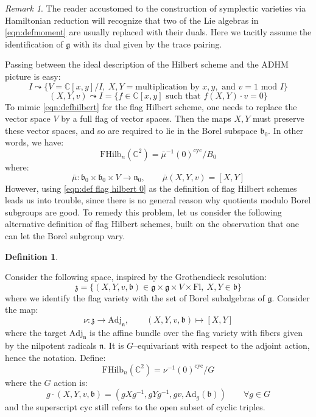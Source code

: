\documentclass[12pt]{amsart}
\numberwithin{equation}{section}
\theoremstyle{definition}
\newtheorem{definition}[theorem]{Definition}
\theoremstyle{remark}
\newtheorem{remark}[theorem]{Remark}
\newcommand{\CC}{\mathbb{C}}
\renewcommand{\1}{\mathbf{1}}
\newcommand{\cyc}{\text{cyc}}
\newcommand{\fl}{\text{Fl}}
\newcommand{\FH}{\mathrm{FHilb}}
\newcommand{\fg}{\mathfrak{g}}
\newcommand{\fb}{\mathfrak{b}}
\newcommand{\fn}{\mathfrak{n}}
\newcommand{\fz}{\mathfrak{z}}
\newcommand{\Adj}{\mathrm{Adj}}
\begin{document}
\begin{remark}

The reader accustomed to the construction of symplectic varieties via Hamiltonian reduction will recognize that two of the Lie algebras in \eqref{eqn:defmoment} are usually replaced with their duals. Here we tacitly assume the identification of $\fg$ with its dual given by the trace pairing.

\end{remark}

Passing between the ideal description of the Hilbert scheme and the ADHM picture is easy:
$$
I \leadsto \{ V = \CC[x,y]/I, \ X,Y  = \text{multiplication by }x,y, \text{ and } v = 1\text{ mod }I \}
$$
$$
(X,Y,v) \leadsto I = \{f\in \CC[x,y] \text{ such that } f(X,Y)\cdot v = 0\} 
$$
To mimic \eqref{eqn:defhilbert} for the flag Hilbert scheme, one needs to replace the vector space $V$ by a full flag of vector spaces. Then the maps $X,Y$ must preserve these vector spaces, and so are required to lie in the Borel subspace $\fb_0$. In other words, we have:
\begin{equation}
\label{eqn:def flag hilbert 0}
\FH_n(\CC^2) = \bar{\mu}^{-1}(0)^{\cyc}/B_0
\end{equation}
where:
$$
\bar{\mu}: \fb_0 \times \fb_0 \times V \longrightarrow \fn_0, \qquad \bar{\mu}(X,Y,v) = [X,Y]
$$
However, using \eqref{eqn:def flag hilbert 0} as the definition of flag Hilbert schemes leads us into trouble, since there is no general reason why quotients modulo Borel subgroups are good. To remedy this problem, let us consider the following alternative definition of flag Hilbert schemes, built on the observation that one can let the Borel subgroup vary.

\begin{definition}
\label{def:flag} 

Consider the following space, inspired by the Grothendieck resolution:
$$
\fz = \Big\{(X,Y,v,\fb) \in \fg \times \fg \times V \times \fl, \ X,Y \in \fb \Big\}
$$
where we identify the flag variety with the set of Borel subalgebras of $\fg$. Consider the map:
\begin{equation}
\label{eqn:def nu}
\nu : \fz \longrightarrow \Adj_\fn, \qquad (X,Y,v,\fb) \mapsto [X,Y] 
\end{equation}
where the target $\Adj_\fn$ is the affine bundle over the flag variety with fibers given by the nilpotent radicals $\fn$. It is $G$--equivariant with respect to the adjoint action, hence the notation. Define:
\begin{equation}
\label{eqn:def flag hilbert}
\FH_n(\CC^2) = \nu^{-1}(0)^\cyc/G
\end{equation}
where the $G$ action is:
$$
g\cdot (X,Y,v,\fb) = \left( gXg^{-1},gYg^{-1},gv,\text{Ad}_g(\fb) \right)  \qquad \forall g \in G
$$
and the superscript $\cyc$ still refers to the open subset of cyclic triples.

\end{definition}
\end{document}
